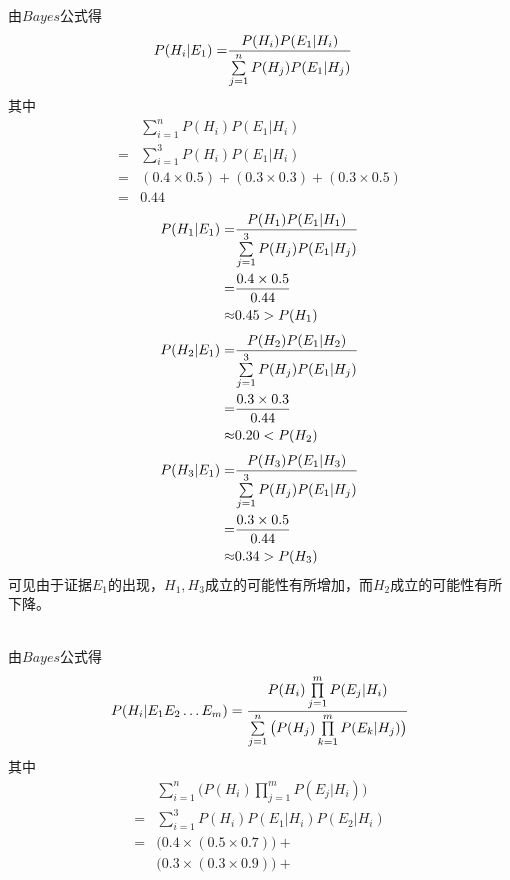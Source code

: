 \begin{answer}
\ 
\begin{subanswer}
    \ \\
    由$Bayes$公式得
    \begin{align}
    P(H_i|E_1)=& \frac{P(H_i)P(E_1|H_i)} {\sum\limits_{j=1}^{n} P(H_j)P(E_1|H_j)}
    \end{align}
    其中
    \begin{align*}
    &\sum\limits_{i=1}^{n}P(H_i)P(E_1|H_i) \\ 
    =&\sum\limits_{i=1}^{3} P(H_i)P(E_1|H_i) \\
    =& (0.4 \times 0.5) + (0.3 \times 0.3) + (0.3 \times 0.5) \\
    =& 0.44
    \end{align*}
    \begin{align}
    P(H_1|E_1)=& \frac{P(H_1)P(E_1|H_1)} {\sum\limits_{j=1}^{3} P(H_j)P(E_1|H_j)} \notag\\
    =&\frac{0.4 \times 0.5}{0.44} \notag\\
    \approx&0.45 > P(H_1)
    \end{align}
    \begin{align}
    P(H_2|E_1)=& \frac{P(H_2)P(E_1|H_2)} {\sum\limits_{j=1}^{3} P(H_j)P(E_1|H_j)} \notag\\
    =&\frac{0.3 \times 0.3}{0.44} \notag\\
    \approx&0.20 < P(H_2)
    \end{align}
    \begin{align}
    P(H_3|E_1)=& \frac{P(H_3)P(E_1|H_3)} {\sum\limits_{j=1}^{3} P(H_j)P(E_1|H_j)} \notag\\
    =&\frac{0.3 \times 0.5}{0.44} \notag\\
    \approx&0.34 > P(H_3)
    \end{align}
    可见由于证据$E_1$的出现，$H_1,H_3$成立的可能性有所增加，而$H_2$成立的可能性有所下降。
\end{subanswer}
\begin{subanswer}
    \ \\
    由$Bayes$公式得
    \begin{align}
    P(H_i|E_1E_2\dots E_m)= \frac{P(H_i)\prod\limits_{j=1}^{m}P(E_j|H_i)} {\sum\limits_{j=1}^{n}\big(P(H_j)\prod\limits_{k=1}^{m}P(E_k|H_j)\big)}
    \end{align}
    其中
    \begin{align*}
    &\sum\limits_{i=1}^{n}\big(P(H_i)\prod\limits_{j=1}^{m}P(E_j|H_i)\big) \\
    =&\sum\limits_{i=1}^{3}P(H_i)P(E_1|H_i)P(E_2|H_i) \\
    =&\big(0.4 \times (0.5 \times 0.7)\big)+ \\
    &\big(0.3 \times (0.3 \times 0.9)\big)+ \\

\end{align*}
\end{subanswer}
\end{answer}

